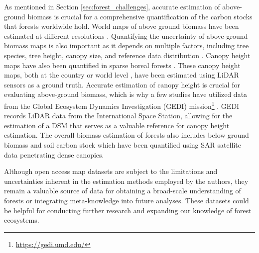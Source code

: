 \documentclass{CUP-JNL-DTM}%
\newcommand{\ELc}[1]{\textcolor{orange}{[\textbf{Eti}: #1]}}
\theoremstyle{definition}
\numberwithin{equation}{section}
\begin{document}
As mentioned in Section \ref{sec:forest_challenges}, accurate estimation of above-ground biomass is crucial for a comprehensive quantification of the carbon stocks that forests worldwide hold.
%
World maps of above ground biomass have been estimated at different resolutions \cite{patterson_statistical_2019, tang_high-resolution_2021, ma_high-resolution_2021, santoro_global_2021}.
%
Quantifying the uncertainty of above-ground biomass maps is also important as it depends on multiple factors, including tree species, tree height, canopy size, and reference data distribution \cite{patterson_statistical_2019, santoro_global_2021, ploton2020spatial}.
%
Canopy height maps have also been quantified in sparse boreal forests
\cite{bartsch_land_2016, bartsch_feasibility_2020}.
These canopy height maps, both at the country \cite{tolan_sub-meter_2023} or world level \cite{lang_global_2022, lang_high-resolution_2022}, have been estimated using LiDAR sensors as a ground truth.
%
Accurate estimation of canopy height is crucial for evaluating above-ground biomass, which is why a few studies have utilized data from the Global Ecosystem Dynamics Investigation (GEDI) mission\footnote{\url{https://gedi.umd.edu/}} \cite{patterson_statistical_2019, tang_high-resolution_2021, ma_high-resolution_2021, lang_global_2022, tolan_sub-meter_2023}. 
GEDI records LiDAR data from the International Space Station, allowing for the estimation of a DSM that serves as a valuable reference for canopy height estimation.
%
The overall biomass estimation of forests also includes below ground biomass \cite{chen_maps_2023} and soil carbon stock \cite{dionizio_carbon_2020} which have been quantified using SAR satellite data penetrating dense canopies.


Although open access map datasets are subject to the limitations and uncertainties inherent in the estimation methods employed by the authors, they remain a valuable source of data for obtaining a broad-scale understanding of forests or integrating meta-knowledge into future analyses. These datasets could be helpful for conducting further research and expanding our knowledge of forest ecosystems.
\end{document}
